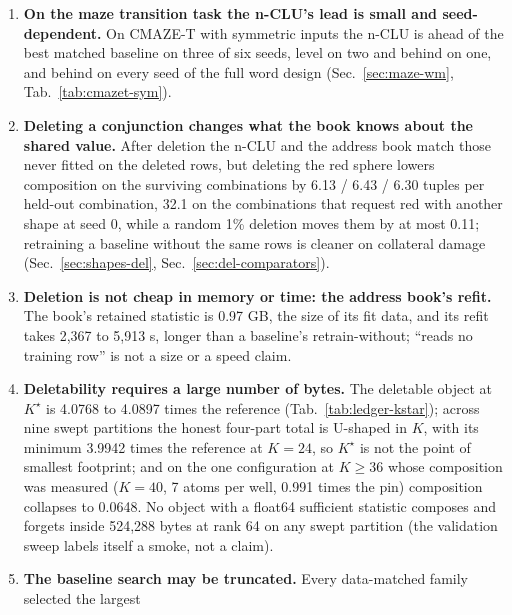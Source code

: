 \documentclass{article} %
\newcommand{\Kstar}{\ensuremath{K^{\star}}}
\begin{document}
\begin{enumerate}
\item \textbf{On the maze transition task the n-CLU's lead is small and seed-dependent.}
  On CMAZE-T with symmetric inputs the n-CLU is ahead of the best matched baseline on three of six seeds,
  level on two and behind on one, and behind on every seed of the full word design %
  (Sec.~\ref{sec:maze-wm}, Tab.~\ref{tab:cmazet-sym}).
\item \textbf{Deleting a conjunction changes what the book knows about the shared value.} After deletion
  the n-CLU and the address book match those never fitted on the deleted rows, but deleting the red
  sphere lowers composition on
  the surviving combinations by 6.13 / 6.43 / 6.30 tuples per held-out combination, 32.1 on the combinations that request red %
  with another shape at seed 0, while a random 1\% deletion moves them by at most 0.11; retraining a %
  baseline without the same rows is cleaner on collateral damage (Sec.~\ref{sec:shapes-del},
  Sec.~\ref{sec:del-comparators}).
\item \textbf{Deletion is not cheap in memory or time: the address book's refit.} The book's retained statistic is 0.97 GB, %
  the size of its fit data, and its refit takes 2,367 to 5,913 s, longer than a baseline's %
  retrain-without; ``reads no training row'' is not a size or a speed claim.
\item \textbf{Deletability requires a large number of bytes.} The deletable object at $\Kstar$ is 4.0768 to 4.0897
  times the reference (Tab.~\ref{tab:ledger-kstar}); across nine swept partitions the honest
  four-part total is U-shaped in $K$, with its minimum 3.9942 times the reference at $K=24$, so
  $\Kstar$ is not the point of smallest footprint; and on the one configuration at $K\ge36$ whose composition
  was measured ($K=40$, 7 atoms per well, 0.991 times the pin) composition collapses to 0.0648.
  No object with a float64 sufficient statistic composes and forgets inside 524,288 bytes at rank
  64 on any swept partition (the validation sweep labels itself a smoke, not a claim).
\item \textbf{The baseline search may be truncated.} Every data-matched family selected the largest

\end{enumerate}
\end{document}
